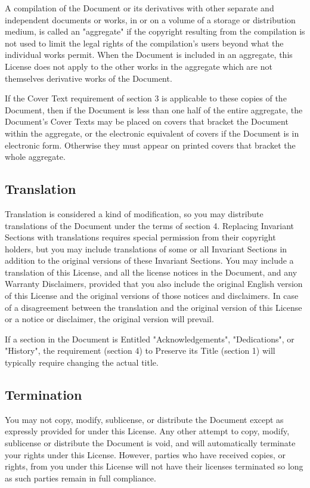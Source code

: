\documentclass[11pt]{article}
\begin{document}
A compilation of the Document or its derivatives with other separate
and independent documents or works, in or on a volume of a storage or
distribution medium, is called an "aggregate" if the copyright
resulting from the compilation is not used to limit the legal rights
of the compilation's users beyond what the individual works permit.
When the Document is included in an aggregate, this License does not
apply to the other works in the aggregate which are not themselves
derivative works of the Document.

If the Cover Text requirement of section 3 is applicable to these
copies of the Document, then if the Document is less than one half of
the entire aggregate, the Document's Cover Texts may be placed on
covers that bracket the Document within the aggregate, or the
electronic equivalent of covers if the Document is in electronic form.
Otherwise they must appear on printed covers that bracket the whole
aggregate.


\subsection*{Translation}

Translation is considered a kind of modification, so you may
distribute translations of the Document under the terms of section 4.
Replacing Invariant Sections with translations requires special
permission from their copyright holders, but you may include
translations of some or all Invariant Sections in addition to the
original versions of these Invariant Sections.  You may include a
translation of this License, and all the license notices in the
Document, and any Warranty Disclaimers, provided that you also include
the original English version of this License and the original versions
of those notices and disclaimers.  In case of a disagreement between
the translation and the original version of this License or a notice
or disclaimer, the original version will prevail.

If a section in the Document is Entitled "Acknowledgements",
"Dedications", or "History", the requirement (section 4) to Preserve
its Title (section 1) will typically require changing the actual
title.


\subsection*{Termination}

You may not copy, modify, sublicense, or distribute the Document except
as expressly provided for under this License.  Any other attempt to
copy, modify, sublicense or distribute the Document is void, and will
automatically terminate your rights under this License.  However,
parties who have received copies, or rights, from you under this
License will not have their licenses terminated so long as such
parties remain in full compliance.
\end{document}
